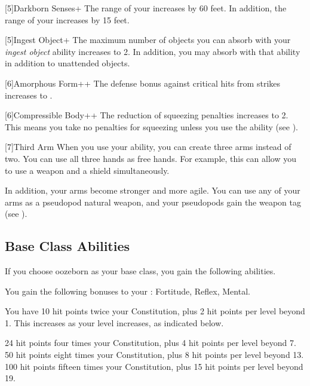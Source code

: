         [5]{Darkborn Senses+} The range of your  increases by 60 feet.
        In addition, the range of your  increases by 15 feet.

        [5]{Ingest Object+} The maximum number of objects you can absorb with your \textit{ingest object} ability increases to 2.
        In addition, you may absorb  with that ability in addition to unattended objects.

        [6]{Amorphous Form++} The defense bonus against critical hits from strikes increases to .

        [6]{Compressible Body++} The reduction of squeezing penalties increases to 2.
        This means you take no penalties for squeezing unless you use the  ability (see ).

        [7]{Third Arm} When you use your  ability, you can create three arms instead of two.
        You can use all three hands as free hands.
        For example, this can allow you to use a  weapon and a shield simultaneously.

        In addition, your arms become stronger and more agile.
        You can use any of your arms as a pseudopod natural weapon, and your pseudopods gain the  weapon tag (see ).

    \subsection{Base Class Abilities}
        If you choose oozeborn as your base class, you gain the following abilities.

        You gain the following bonuses to your :  Fortitude,  Reflex,  Mental.

            You have 10 hit points \add twice your Constitution, plus 2 hit points per level beyond 1.
            This increases as your level increases, as indicated below.
            \begin{itemize}
                 24 hit points \add four times your Constitution, plus 4 hit points per level beyond 7.
                 50 hit points \add eight times your Constitution, plus 8 hit points per level beyond 13.
                 100 hit points \add fifteen times your Constitution, plus 15 hit points per level beyond 19.
            \end{itemize}

